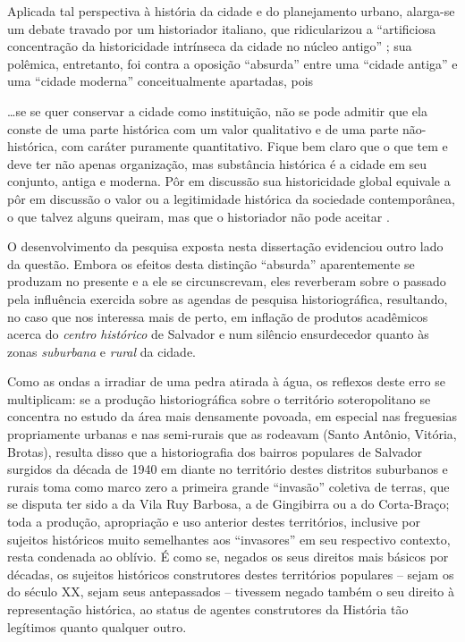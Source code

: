 Aplicada tal perspectiva à história da cidade e do planejamento urbano, alarga-se um debate travado por um historiador italiano, que ridicularizou a ``artificiosa concentração da historicidade intrínseca da cidade no núcleo antigo'' \cite[p.~74]{argan_histcid_1992}; sua polêmica, entretanto, foi contra a oposição ``absurda'' entre uma ``cidade antiga'' e uma ``cidade moderna'' conceitualmente apartadas, pois 

\begin{citacao}
\dots se se quer conservar a cidade como instituição, não se pode admitir que ela conste de uma parte histórica com um valor qualitativo e de uma parte não-histórica, com caráter puramente quantitativo. Fique bem claro que o que tem e deve ter não apenas organização, mas substância histórica é a cidade em seu conjunto, antiga e moderna. Pôr em discussão sua historicidade global equivale a pôr em discussão o valor ou a legitimidade histórica da sociedade contemporânea, o que talvez alguns queiram, mas que o historiador não pode aceitar \cite[p.~79]{argan_histcid_1992}.
\end{citacao}

O desenvolvimento da pesquisa exposta nesta dissertação evidenciou outro lado da questão. Embora os efeitos desta distinção ``absurda'' aparentemente se produzam no presente e a ele se circunscrevam, eles reverberam sobre o passado pela influência exercida sobre as agendas de pesquisa historiográfica, resultando, no caso que nos interessa mais de perto, em inflação de produtos acadêmicos acerca do \textit{centro histórico} de Salvador e num silêncio ensurdecedor quanto às zonas \textit{suburbana} e \textit{rural} da cidade. 

Como as ondas a irradiar de uma pedra atirada à água, os reflexos deste erro se multiplicam: se a produção historiográfica sobre o território soteropolitano se concentra no estudo da área mais densamente povoada, em especial nas freguesias propriamente urbanas e nas semi-rurais que as rodeavam (Santo Antônio, Vitória, Brotas), resulta disso que a historiografia dos bairros populares de Salvador surgidos da década de 1940 em diante no território destes distritos suburbanos e rurais toma como marco zero a primeira grande ``invasão'' coletiva de terras, que se disputa ter sido a da Vila Ruy Barbosa, a de Gingibirra ou a do Corta-Braço; toda a produção, apropriação e uso anterior destes territórios, inclusive por sujeitos históricos muito semelhantes aos ``invasores'' em seu respectivo contexto, resta condenada ao oblívio. É como se, negados os seus direitos mais básicos por décadas, os sujeitos históricos construtores destes territórios populares -- sejam os do século XX, sejam seus antepassados --  tivessem negado também o seu direito à representação histórica, ao status de agentes construtores da História tão legítimos quanto qualquer outro.

